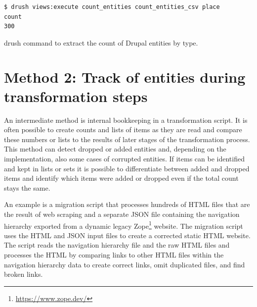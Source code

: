 \documentclass[final]{anthology-ch} %
\begin{document}
\begin{listing}
\begin{verbatim}
$ drush views:execute count_entities count_entities_csv place
count
300
\end{verbatim}
 \caption{drush command to extract the count of Drupal entities by type.}
\label{code:ismi-cnt}
\end{listing}

\section{Method 2: Track of entities during transformation steps}

An intermediate method is internal bookkeeping in a transformation script. It is often possible to create counts and lists of items as they are read and compare these numbers or lists to the results of later stages of the transformation process. This method can detect dropped or added entities and, depending on the implementation, also some cases of corrupted entities. If items can be identified and kept in lists or sets it is possible to differentiate between added and dropped items and identify which items were added or dropped even if the total count stays the same.

An example is a migration script that processes hundreds of HTML files that are the result of web scraping and a separate JSON file containing the navigation hierarchy exported from a dynamic legacy Zope\footnote{\url{https://www.zope.dev/}} website. The migration script uses the HTML and JSON input files to create a corrected static HTML website. The script reads the navigation hierarchy file and the raw HTML files and processes the HTML by comparing links to other HTML files within the navigation hierarchy data to create correct links, omit duplicated files, and find broken links.
\end{document}
